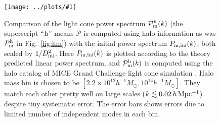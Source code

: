 \documentclass[prd,amsmath,amssymb,floatfix,superscriptaddress,nofootinbib,twocolumn]{revtex4-1}
\newcommand{\ini}{\rm ini}
\newcommand{\rf}[1]{\ref{fig:#1}}
\newcommand{\sfig}[2]{
\texttt{[image: ../plots/\#1]}
        }
\newcommand{\Sfig}[2]{
   \begin{figure}[thbp]
   \begin{center}
    \sfig{../plots/#1.pdf}{\columnwidth}
    \caption{{\small #2}}
    \label{fig:#1}
     \end{center}
   \end{figure}
}
\begin{document}
\Sfig{psLC}{Comparison of the light cone power spectrum $\mathcal{P}_{\rm m}^{\rm h}(k)$ (the superscript ``$\rm h$'' means $\mathcal{P}$ is computed using halo information as was $P_{\rm m}^{\rm h}$ in Fig.~\rf{hm}) with the initial power spectrum $P_{\rm m,ini}(k)$, both scaled by $1/D_{\ini}^{2}$. Here $P_{\rm m,ini}(k)$ is plotted according to the theory predicted linear power spectrum, and $\mathcal{P}_{\rm m}^{\rm h}(k)$ is computed using the halo catalog of MICE Grand Challenge light cone simulation \cite{Fosalba:2015MI}\cite{Fosalba:2015MII}. Halo mass bin is chosen to be $[2.2 \times 10^{12}h^{-1}M_{\odot},10^{14}h^{-1}M_{\odot}]$. They match each other pretty well on large scales ($k\lesssim 0.02 \,h\,\rm Mpc^{-1}$) despite tiny systematic error. The error bars shows errors due to limited number of independent modes in each bin.}
\end{document}
